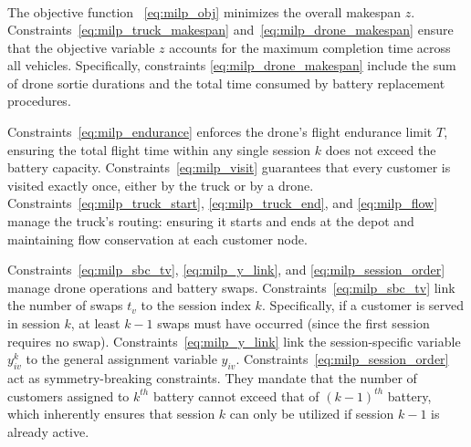 \documentclass[3p, authoryear, 11pt]{elsarticle}
\begin{document}
\begin{align}
\end{align}

The objective function ~\eqref{eq:milp_obj} minimizes the overall makespan $z$. Constraints~\eqref{eq:milp_truck_makespan} and~\eqref{eq:milp_drone_makespan} ensure that the objective variable $z$ accounts for the maximum completion time across all vehicles. Specifically, constraints \eqref{eq:milp_drone_makespan} include the sum of drone sortie durations and the total time consumed by battery replacement procedures.

Constraints~\eqref{eq:milp_endurance} enforces the drone's flight endurance limit $T$, ensuring the total flight time within any single session $k$ does not exceed the battery capacity. Constraints~\eqref{eq:milp_visit} guarantees that every customer is visited exactly once, either by the truck or by a drone. Constraints~\eqref{eq:milp_truck_start}, \eqref{eq:milp_truck_end}, and \eqref{eq:milp_flow} manage the truck's routing: ensuring it starts and ends at the depot and maintaining flow conservation at each customer node.

Constraints~\eqref{eq:milp_sbc_tv}, \eqref{eq:milp_y_link}, and \eqref{eq:milp_session_order} manage drone operations and battery swaps. Constraints~\eqref{eq:milp_sbc_tv} link the number of swaps $t_v$ to the session index $k$. Specifically, if a customer is served in session $k$, at least $k-1$ swaps must have occurred (since the first session requires no swap). Constraints~\eqref{eq:milp_y_link} link the session-specific variable $y^k_{iv}$ to the general assignment variable $y_{iv}$. Constraints~\eqref{eq:milp_session_order} act as symmetry-breaking constraints. They mandate that the number of customers assigned to $k^{th}$ battery cannot exceed that of $(k-1)^{th}$ battery, which inherently ensures that session $k$ can only be utilized if session $k-1$ is already active.
\end{document}
